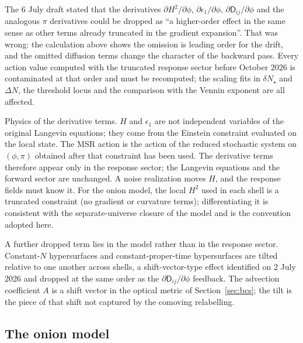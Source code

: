 \documentclass[a4paper,11pt]{article}
\newcommand{\semibold}[1]{{\fontseries{b}\selectfont{#1}}}
\newenvironment{panel}{\begin{tcolorbox}[enhanced,breakable,colback=gray!10,colframe=gray!30]\small}{\end{tcolorbox}}
\newcommand{\Ny}{N}                          %
\newcommand{\DN}{\Delta N}                   %
\newcommand{\dNstar}{\delta N_\star}         %
\newcommand{\epsSR}{\epsilon_1}              %
\newcommand{\Hub}{H}                         %
\newcommand{\field}{\phi}                    %
\newcommand{\mom}{\pi}                       %
\newcommand{\advcoef}{A}                     %
\newcommand{\Dcm}[1]{\mathsf{D}_{#1}}        %
\begin{document}
\begin{panel}
\semibold{Terms previously dropped.} The 6 July draft stated that the
derivatives $\partial\Hub^2/\partial\field$, $\partial\epsSR/\partial\field$,
$\partial\Dcm{ij}/\partial\field$ and the analogous $\mom$ derivatives
could be dropped as ``a higher-order effect in the same sense as other
terms already truncated in the gradient expansion''. That was wrong: the
calculation above shows the omission is leading order for the drift, and
the omitted diffusion terms change the character of the backward pass.
Every action value computed with the truncated response sector before
October 2026 is contaminated at that order and must be recomputed; the
scaling fits in $\dNstar$ and $\DN$, the threshold locus and the comparison
with the Vennin exponent are all affected.

Physics of the derivative terms. $\Hub$ and $\epsSR$ are not independent
variables of the original Langevin equations; they come from the
Einstein constraint evaluated on the local state. The MSR action is the
action of the reduced stochastic system on $(\field,\mom)$ obtained after
that constraint has been used. The derivative terms therefore appear only
in the response sector; the Langevin equations and the forward sector are
unchanged. A noise realization moves $\Hub$, and the response fields must
know it. For the onion model, the local $\Hub^2$ used in each shell is a
truncated constraint (no gradient or curvature terms); differentiating it
is consistent with the separate-universe closure of the model and is the
convention adopted here.

A further dropped term lies in the model rather than in the response
sector. Constant-$\Ny$ hypersurfaces and constant-proper-time
hypersurfaces are tilted relative to one another across shells, a
shift-vector-type effect identified on 2 July 2026 and dropped at the same
order as the $\partial\Dcm{ij}/\partial\field$ feedback. The advection
coefficient $\advcoef$ is a shift vector in the optical metric of
Section~\ref{sec:bcs}; the tilt is the piece of that shift not captured by
the comoving relabelling.
\end{panel}

\subsection{The onion model}
\label{sec:onion-eqs}
\end{document}
